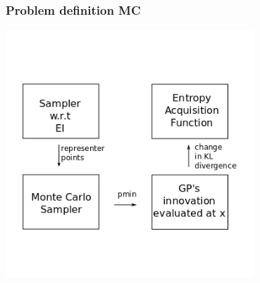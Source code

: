 \documentclass[10pt,handout]{beamer}
\begin{document}
\begin{frame}
\frametitle{Problem definition MC}

\begin{center}
\includegraphics[width=0.7\textwidth]{robo_entropy2.png}
\end{center}
\end{frame}
\end{document}
